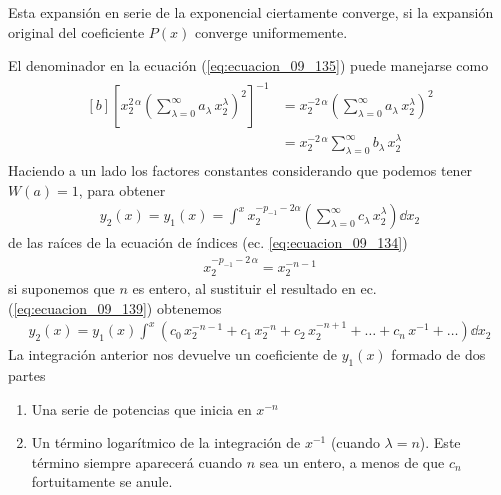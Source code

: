 Esta expansión en serie de la exponencial ciertamente converge, si la expansión original del coeficiente $P(x)$ converge uniformemente.
\par
El denominador en la ecuación (\ref{eq:ecuacion_09_135}) puede manejarse como
\begin{align}
\begin{aligned}[b]
\left[ x_{2}^{2 \, \alpha} \left( \sum_{\lambda=0}^{\infty} a_{\lambda} \, x_{2}^{\lambda} \right)^{2} \right]^{-1} &= x_{2}^{-2 \, \alpha} \left( \sum_{\lambda=0}^{\infty} a_{\lambda} \, x_{2}^{\lambda} \right)^{2}  \\
&= x_{2}^{-2 \, \alpha} \sum_{\lambda=0}^{\infty} b_{\lambda} \, x_{2}^{\lambda}
\end{aligned}
\label{eq:ecuacion_09_138}
\end{align}
Haciendo a un lado los factores constantes considerando que podemos tener $W(a) = 1$, para obtener
\begin{align}
y_{2}(x) =  y_{1}(x) = \int^{x} x_{2}^{-p_{-1}-2 \alpha} \left( \sum_{\lambda=0}^{\infty} c_{\lambda} \, x_{2}^{\lambda} \right) \dd{x_{2}} 
\label{eq:ecuacion_09_139}
\end{align}
de las raíces de la ecuación de índices (ec. \ref{eq:ecuacion_09_134})
\begin{align}
x_{2}^{-p_{-1} - 2 \, \alpha} = x_{2}^{-n-1}
\end{align}
si suponemos que $n$ es entero, al sustituir el resultado en ec. (\ref{eq:ecuacion_09_139}) obtenemos 
\begin{align}
y_{2}(x) = y_{1}(x) \int^{x} (c_{0} \, x_{2}^{-n-1} + c_{1} \, x_{2}^{-n} + c_{2} \, x_{2}^{-n+1} + \ldots + c_{n} \, x^{-1} + \ldots ) \dd{x_{2}}
\label{eq:ecuacion_09_141}
\end{align}
La integración anterior nos devuelve un coeficiente de $y_{1}(x)$ formado de dos partes
\begin{enumerate}
\item Una serie de potencias que inicia en $x^{-n}$
\item Un término logarítmico de la integración de $x^{-1}$ (cuando $\lambda=n$). Este término siempre aparecerá cuando $n$ sea un entero, a menos de que $c_{n}$ fortuitamente se anule.
\end{enumerate}

